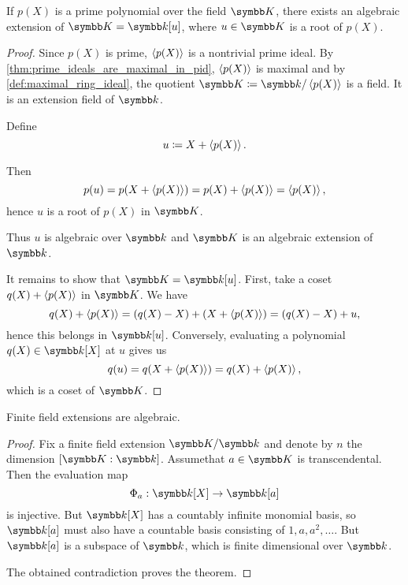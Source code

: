 \begin{theorem}\label{thm:algebraic_extension_always_exists}\cite[485]{Knapp2016BAlg}
  If \( p(X) \) is a prime polynomial over the field \( \K \), there exists an algebraic extension of \( \K = \Kl[u] \), where \( u \in \K \) is a root of \( p(X) \).
\end{theorem}
\begin{proof}
  Since \( p(X) \) is prime, \( \left\langle p(X) \right\rangle \) is a nontrivial prime ideal. By \cref{thm:prime_ideals_are_maximal_in_pid}, \( \left\langle p(X) \right\rangle \) is maximal and by \cref{def:maximal_ring_ideal}, the quotient \( \K \coloneqq \Kl / \Gen{p(X)} \) is a field. It is an extension field of \( \Kl \).

  Define
  \begin{equation*}
    u \coloneqq X + \left\langle p(X) \right\rangle.
  \end{equation*}

  Then
  \begin{equation*}
    p(u) = p(X + \left\langle p(X) \right\rangle) = p(X) + \left\langle p(X) \right\rangle = \left\langle p(X) \right\rangle,
  \end{equation*}
  hence \( u \) is a root of \( p(X) \) in \( \K \).

  Thus \( u \) is algebraic over \( \Kl \) and \( \K \) is an algebraic extension of \( \Kl \).

  It remains to show that \( \K = \Kl[u] \). First, take a coset \( q(X) + \left\langle p(X) \right\rangle \) in \( \K \). We have
  \begin{equation*}
    q(X) + \left\langle p(X) \right\rangle = (q(X) - X) + (X + \left\langle p(X) \right\rangle) = (q(X) - X) + u,
  \end{equation*}
  hence this belongs in \( \Kl[u] \). Conversely, evaluating a polynomial \( q(X) \in \Kl[X] \) at \( u \) gives us
  \begin{equation*}
    q(u) = q(X + \left\langle p(X) \right\rangle) = q(X) + \left\langle p(X) \right\rangle,
  \end{equation*}
  which is a coset of \( \K \).
\end{proof}

\begin{proposition}\label{thm:finite_field_extensions_are_algebraic}
  Finite field extensions are algebraic.
\end{proposition}
\begin{proof}
  Fix a finite field extension \( \K / \Kl \) and denote by \( n \) the dimension \( [\K : \Kl] \). Assume\LEM that \( a \in \K \) is transcendental. Then the evaluation map
  \begin{equation*}
    \Phi_a: \Kl[X] \to \Kl[a]
  \end{equation*}
  is injective. But \( \Kl[X] \) has a countably infinite monomial basis, so \( \Kl[a] \) must also have a countable basis consisting of \( 1, a, a^2, \ldots \). But \( \Kl[a] \) is a subspace of \( \Kl \), which is finite dimensional over \( \Kl \).

  The obtained contradiction proves the theorem.
\end{proof}

